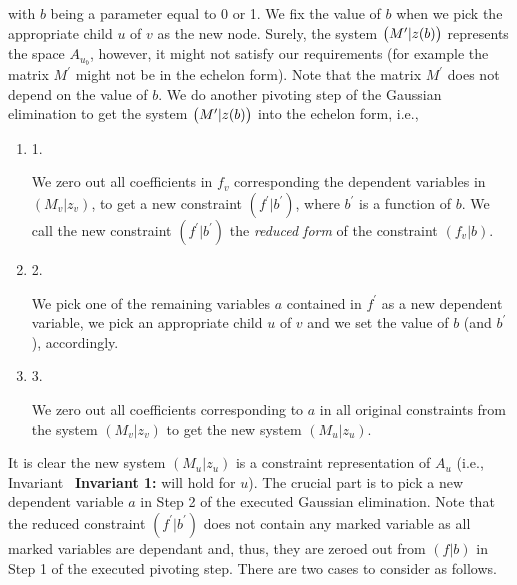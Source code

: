 with $b$ being a parameter equal to 0 or 1.
We fix the value of $b$ when we pick the appropriate child $u$ of $v$ as the new node.
Surely, the system $\bigl{(}M^{\prime}|z(b)\bigr{)}$ represents the space $A_{u_{b}}$, however, it might not satisfy our requirements (for example the matrix $M^{\prime}$ might not be in the echelon form).
Note that the matrix $M^{\prime}$ does not depend on the value of $b$.
We do another pivoting step of the Gaussian elimination to get the system $\bigl{(}M^{\prime}|z(b)\bigr{)}$ into the echelon form, i.e.,\par


\begin{enumerate}


\item[] 
1. 


We zero out all coefficients in $f_{v}$ corresponding the dependent variables in $(M_{v}|z_{v})$, to get a new constraint $(f^{\prime}|b^{\prime})$, where $b^{\prime}$ is a function of $b$. We call the new constraint $(f^{\prime}|b^{\prime})$ the \emph{reduced form} of the constraint $(f_{v}|b)$.\par





\item[] 
2. 


We pick one of the remaining variables $a$ contained in $f^{\prime}$ as a new dependent variable, we pick an appropriate child $u$ of $v$ and we set the value of $b$ (and $b^{\prime}$), accordingly.\par





\item[] 
3. 


We zero out all coefficients corresponding to $a$ in all original constraints from the system $(M_{v}|z_{v})$ to get the new system $(M_{u}|z_{u})$.\par





\end{enumerate}


It is clear the new system $(M_{u}|z_{u})$ is a constraint representation of $A_{u}$ (i.e., Invariant \textbf{ Invariant 1:} will hold for $u$).
The crucial part is to pick a new dependent variable $a$ in Step 2 of the executed Gaussian elimination.
Note that the reduced constraint $(f^{\prime}|b^{\prime})$ does not contain any marked variable as all marked variables are dependant and, thus, they are zeroed out from $(f|b)$ in Step 1 of the executed pivoting step.
There are two cases to consider as follows.\par





